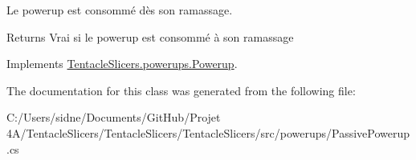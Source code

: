 Le powerup est consommé dès son ramassage. 

\begin{DoxyReturn}{Returns}
Vrai si le powerup est consommé à son ramassage 
\end{DoxyReturn}


Implements \hyperlink{class_tentacle_slicers_1_1powerups_1_1_powerup_a52c58d3898d05020220fc317b6f901d9}{Tentacle\+Slicers.\+powerups.\+Powerup}.



The documentation for this class was generated from the following file\+:\begin{DoxyCompactItemize}
\item 
C\+:/\+Users/sidne/\+Documents/\+Git\+Hub/\+Projet 4\+A/\+Tentacle\+Slicers/\+Tentacle\+Slicers/\+Tentacle\+Slicers/src/powerups/Passive\+Powerup.\+cs\end{DoxyCompactItemize}
